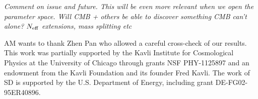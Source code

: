 \documentclass[aps,prd,reprint,superscriptaddress]{revtex4-1}
\begin{document}
\textit{Comment on issue and future. This will be even more relevant when we open the parameter space. Will CMB + others be able to discover something CMB can't alone? $N_{\rm eff}$ extensions, mass splitting etc}





\begin{acknowledgments}
AM wants to thank Zhen Pan who allowed a careful cross-check of our results.
This work was partially supported by the Kavli Institute for Cosmological Physics at the University of Chicago through grants NSF PHY-1125897 and an endowment from the Kavli Foundation and its founder Fred Kavli.
The work of SD is supported by the U.S. Department of Energy, including grant DE-FG02-95ER40896.
\end{acknowledgments}


\end{document}
